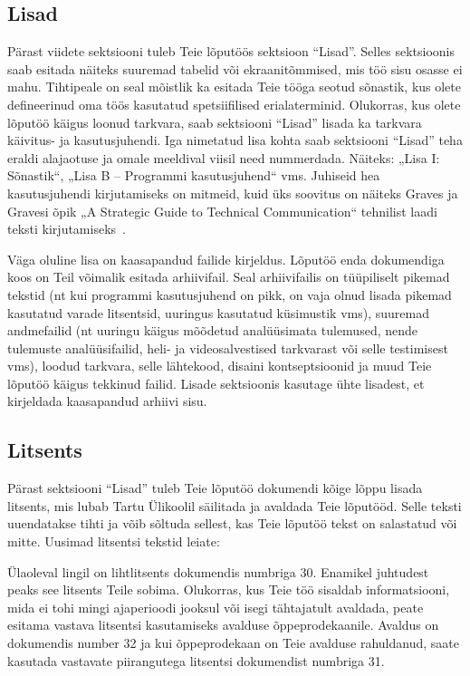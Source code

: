 \subsection{Lisad}
Pärast viidete sektsiooni tuleb Teie lõputöös sektsioon “Lisad”. Selles sektsioonis saab esitada näiteks suuremad tabelid või ekraanitõmmised, mis töö sisu osasse ei mahu. Tihtipeale on seal mõistlik ka esitada Teie tööga seotud sõnastik, kus olete defineerinud oma töös kasutatud spetsiifilised erialaterminid. Olukorras, kus olete lõputöö käigus loonud tarkvara, saab sektsiooni “Lisad” lisada ka tarkvara käivitus- ja kasutusjuhendi. Iga nimetatud lisa kohta saab sektsiooni “Lisad” teha eraldi alajaotuse ja omale meeldival viisil need nummerdada. Näiteks: „Lisa I: Sõnastik“, „Lisa B – Programmi kasutusjuhend“ vms. Juhiseid hea kasutusjuhendi kirjutamiseks on mitmeid, kuid üks soovitus on näiteks Graves ja Gravesi õpik „A Strategic Guide to Technical Communication“ tehnilist laadi teksti kirjutamiseks~\cite{graves_strategic_2012}.

Väga oluline lisa on kaasapandud failide kirjeldus. Lõputöö enda dokumendiga koos on Teil võimalik esitada arhiivifail. Seal arhiivifailis on tüüpiliselt pikemad tekstid (nt kui programmi kasutusjuhend on pikk, on vaja olnud lisada pikemad kasutatud varade litsentsid, uuringus kasutatud küsimustik vms), suuremad andmefailid (nt uuringu käigus mõõdetud analüüsimata tulemused, nende tulemuste analüüsifailid, heli- ja videosalvestised tarkvarast või selle testimisest vms), loodud tarkvara, selle lähtekood, disaini kontseptsioonid ja muud Teie lõputöö käigus tekkinud failid. Lisade sektsioonis kasutage ühte lisadest, et kirjeldada kaasapandud arhiivi sisu.

\subsection{Litsents} \label{subchapter:litsents}
Pärast sektsiooni “Lisad” tuleb Teie lõputöö dokumendi kõige lõppu lisada litsents, mis lubab Tartu Ülikoolil säilitada ja avaldada Teie lõputööd. Selle teksti uuendatakse tihti ja võib sõltuda sellest, kas Teie lõputöö tekst on salastatud või mitte. Uusimad litsentsi tekstid leiate: 

Ülaoleval lingil on lihtlitsents dokumendis numbriga 30. Enamikel juhtudest peaks see litsents Teile sobima. Olukorras, kus Teie töö sisaldab informatsiooni, mida ei tohi mingi ajaperioodi jooksul või isegi tähtajatult avaldada, peate esitama vastava litsentsi kasutamiseks avalduse õppeprodekaanile. Avaldus on dokumendis number 32 ja kui õppeprodekaan on Teie avalduse rahuldanud, saate kasutada vastavate piirangutega litsentsi dokumendist numbriga 31.

